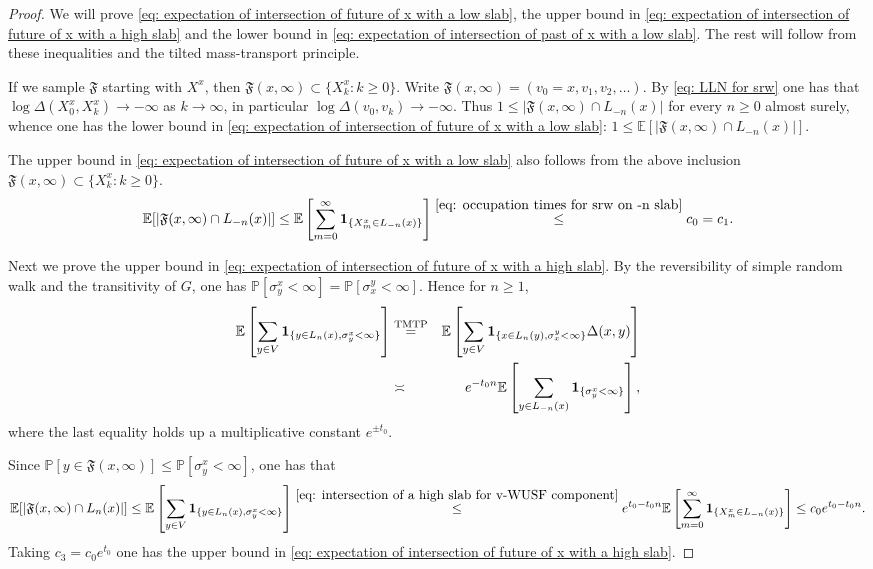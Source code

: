 \documentclass[12pt]{article}
\numberwithin{equation}{section}
\newcommand{\1}{\mathbf{1}}
\begin{document}
 \begin{proof}
 	We will prove \eqref{eq: expectation of intersection of future of x with a low slab}, the upper bound in \eqref{eq: expectation of intersection of future of x with a high slab} and the lower bound in \eqref{eq: expectation of intersection of past of x with a low slab}. The rest will follow from these inequalities and the tilted mass-transport principle.
 	
 	
 	If we sample $\mathfrak{F}$ starting with $X^x$, then $\mathfrak{F}(x,\infty)\subset \{X^x_k:k\geq0\}$. Write $\mathfrak{F}(x,\infty)=(v_0=x,v_1,v_2,\ldots)$. By \eqref{eq: LLN for srw} one has that $\log\Delta(X^x_0,X^x_k)\rightarrow-\infty$ as $k\rightarrow\infty$, in particular $\log\Delta(v_0,v_k)\rightarrow-\infty$. Thus $1\leq |\mathfrak{F}(x,\infty)\cap L_{-n}(x)|$ for every $n\geq0$ almost surely, whence one has the lower bound in \eqref{eq: expectation of intersection of future of x with a low slab}: $1\leq \mathbb{E}[|\mathfrak{F}(x,\infty)\cap L_{-n}(x)|]$. 
 	
 	 The upper bound in \eqref{eq: expectation of intersection of future of x with a low slab} also follows from the above inclusion $\mathfrak{F}(x,\infty)\subset \{X^x_k:k\geq0\}$.
 	\[
 	\mathbb{E}[|\mathfrak{F}(x,\infty)\cap L_{-n}(x)|]\leq 
 	\mathbb{E}\left[\sum_{m=0}^{\infty}\mathbf{1}_{ \{X_m^x\in L_{-n}(x) \} }\right]\stackrel{\eqref{eq: occupation times for srw on -n slab}}{\leq }c_0=c_{1}.
 	\]
 	
 	Next we prove the upper bound in \eqref{eq: expectation of intersection of future of x with a high slab}. By the reversibility of simple random walk and the transitivity of $G$, one has $ \mathbb{P}[\sigma_y^x<\infty]=\mathbb{P}[\sigma_x^y<\infty]$. Hence for $n\geq1$,
 	\begin{eqnarray}\label{eq: intersection of a high slab for v-WUSF component}
 	 	\mathbb{E}\left[\sum_{y\in V}\mathbf{1}_{ \{y\in L_n(x), \sigma_y^x<\infty \} } \right]
 	 	&\stackrel{\textnormal{TMTP}}{=}&
 	 	\mathbb{E}\left[\sum_{y\in V}\mathbf{1}_{ \{x\in L_n(y), \sigma_x^y<\infty \} }\Delta(x,y) \right]\nonumber\\
 	 	&\asymp&e^{-t_0n}\mathbb{E}\left[\sum_{y\in L_{-n}(x)}\mathbf{1}_{ \{ \sigma_y^x<\infty \}}\right],
 	\end{eqnarray}
 	where the last equality holds up a multiplicative constant $e^{\pm t_0}$.
 	
 	Since $\mathbb{P}[y\in\mathfrak{F}(x,\infty)]\leq \mathbb{P}[\sigma_y^x<\infty]$, one has that 
 	\[
 	\mathbb{E}[|\mathfrak{F}(x,\infty)\cap L_{n}(x)|]\leq 
 		\mathbb{E}\left[\sum_{y\in V}\mathbf{1}_{ \{y\in L_n(x), \sigma_y^x<\infty \} } \right]
 		\stackrel{\eqref{eq: intersection of a high slab for v-WUSF component}}{\leq} e^{t_0-t_0n}\mathbb{E}\left[\sum_{m=0}^{\infty}\mathbf{1}_{ \{X_m^x\in L_{-n}(x) \} }\right]\leq c_0e^{t_0-t_0n}.
 	\]
 	Taking $c_{3}=c_0e^{t_0}$ one has the upper bound in \eqref{eq: expectation of intersection of future of x with a high slab}.
 	

\end{proof}
\end{document}
